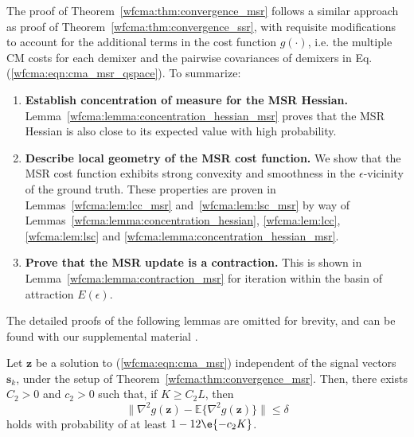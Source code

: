 The proof of Theorem~\ref{wfcma:thm:convergence_msr} follows a similar approach as
proof of Theorem~\ref{wfcma:thm:convergence_ssr}, 
with requisite modifications to account for the additional terms 
in the cost function $g(\cdot)$, i.e. the multiple 
CM costs for each demixer 
and the pairwise covariances of demixers in Eq.(\ref{wfcma:eqn:cma_msr_qspace}). To summarize:
\begin{enumerate}
\item {\bf Establish concentration of measure for the MSR Hessian.} Lemma~\ref{wfcma:lemma:concentration_hessian_msr} proves that the MSR Hessian is also close to its expected value with high probability.%
\item {\bf Describe local geometry of the MSR cost function.} We show that the MSR cost function exhibits strong convexity and smoothness in the $\epsilon$-vicinity of the ground truth. These properties are proven in Lemmas~\ref{wfcma:lem:lcc_msr} and~\ref{wfcma:lem:lsc_msr} by way of Lemmas~\ref{wfcma:lemma:concentration_hessian}, \ref{wfcma:lem:lcc}, \ref{wfcma:lem:lsc} and \ref{wfcma:lemma:concentration_hessian_msr}. 
\item {\bf Prove that the MSR update is a contraction.} This is shown in Lemma~\ref{wfcma:lemma:contraction_msr} for iteration within the basin of attraction $E(\epsilon)$. 
\end{enumerate}
The detailed proofs of the following lemmas are omitted for brevity, and can
be found with our supplemental material \cite{postedSupplemental}.

\begin{lem} \label{wfcma:lemma:concentration_hessian_msr} 
Let $\bm{z}$ be a solution to (\ref{wfcma:eqn:cma_msr}) independent of the signal vectors $\bm{s}_k$, under the setup of Theorem~\ref{wfcma:thm:convergence_msr}. Then, there exists $C_2>0$ and $c_2>0$ such that, if $K\geq C_2 L$, then
\begin{equation}
	\big\|\nabla^2 g(\bm{z}) - \mathbb{E}\{\nabla^2 g(\bm{z})\}\big\| \leq \delta \label{wfcma:eqn:concentration_hessian_msr}
\end{equation}
holds with probability of at least $1 -12\e{-c_2K}$.
\end{lem}

